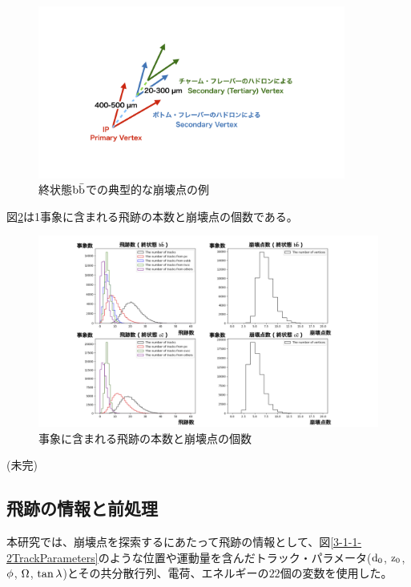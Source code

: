 \begin{figure}[h]
 \centering
 \includegraphics[trim = 0 100 0 50, width=0.9\textwidth]{Figure/3Networks/3-1-1-1FinalStateBB.png}
 \caption{終状態$\rm b\bar{b}$での典型的な崩壊点の例}
 \label{3-1-1-1FinalStateBB}
\end{figure}

図\ref{3-1-1-2TracksandVertices}は1事象に含まれる飛跡の本数と崩壊点の個数である。

\begin{figure}[h]
 \centering
 \includegraphics[width=1.0\textwidth]{Figure/3Networks/3-1-1-2TracksandVertices.png}
 \caption{事象に含まれる飛跡の本数と崩壊点の個数}
 \label{3-1-1-2TracksandVertices}
\end{figure}


(未完)

\subsection{飛跡の情報と前処理} \label{Net:Data:TrackInformationandPreprocessing}

本研究では、崩壊点を探索するにあたって飛跡の情報として、図\ref{3-1-1-2TrackParameters}のような位置や運動量を含んだトラック・パラメータ($\rm d_0$, $\rm z_0$, $\rm \phi$, $\rm \Omega$, $\rm \tan{\lambda}$)\cite{TrackParametersLCIO}とその共分散行列、電荷、エネルギーの$22$個の変数を使用した。

